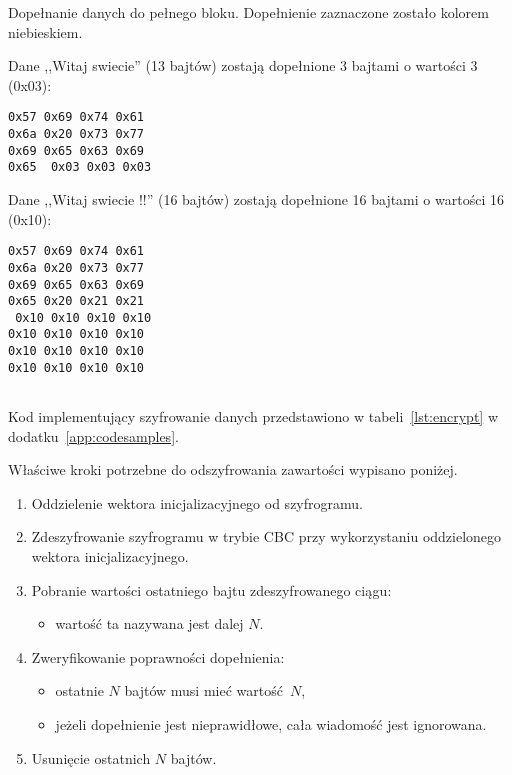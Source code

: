 \begin{table}[th]
\centering
\caption{Dopełnanie danych do pełnego bloku. Dopełnienie zaznaczone zostało kolorem niebieskiem.}
{\footnotesize Dane ,,Witaj swiecie'' (13 bajtów) zostają dopełnione 3 bajtami o wartości 3 (0x03):}

\texttt{0x57 0x69 0x74 0x61\\
0x6a 0x20 0x73 0x77\\
0x69 0x65 0x63 0x69\\
0x65 {\color[rgb]{0,0,1} 0x03 0x03 0x03}}

{\footnotesize Dane ,,Witaj swiecie !!'' (16 bajtów) zostają dopełnione 16 bajtami o wartości 16 (0x10):}

\texttt{0x57 0x69 0x74 0x61\\
0x6a 0x20 0x73 0x77\\
0x69 0x65 0x63 0x69\\
0x65 0x20 0x21 0x21\\
{\color[rgb]{0,0,1}
0x10 0x10 0x10 0x10\\
0x10 0x10 0x10 0x10\\
0x10 0x10 0x10 0x10\\
0x10 0x10 0x10 0x10\\
}
}

\label{tab:padding}
\end{table}

Kod implementujący szyfrowanie danych przedstawiono w tabeli~\ref{lst:encrypt} w dodatku~\ref{app:codesamples}.

Właściwe kroki potrzebne do odszyfrowania zawartości wypisano poniżej.

\begin{enumerate}
\item Oddzielenie wektora inicjalizacyjnego od szyfrogramu.
\item Zdeszyfrowanie szyfrogramu w trybie CBC przy wykorzystaniu oddzielonego wektora inicjalizacyjnego.
\item Pobranie wartości ostatniego bajtu zdeszyfrowanego ciągu:
\begin{itemize}
    \item wartość ta nazywana jest dalej $ N $.
\end{itemize}
\item Zweryfikowanie poprawności dopełnienia:
\begin{itemize}
    \item ostatnie $ N $ bajtów musi mieć wartość $ N $,
    \item jeżeli dopełnienie jest nieprawidłowe, cała wiadomość jest ignorowana.
\end{itemize}
\item Usunięcie ostatnich $ N $ bajtów.
\end{enumerate}

